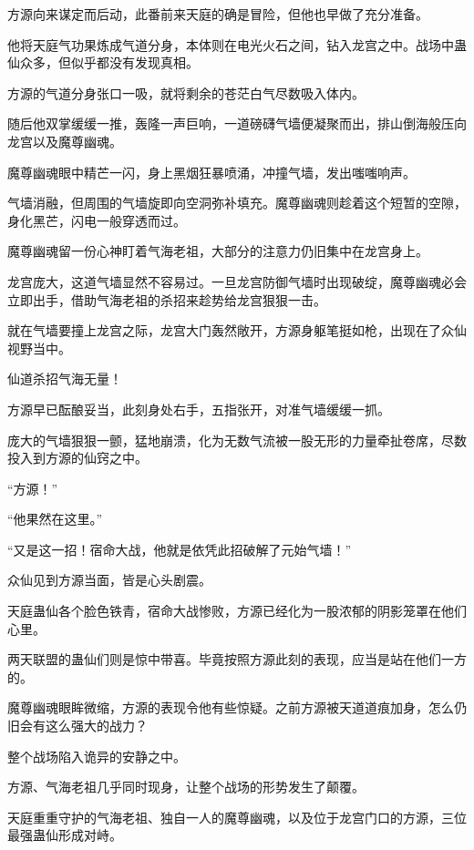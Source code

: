 
\begin{this_body}



方源向来谋定而后动，此番前来天庭的确是冒险，但他也早做了充分准备。

他将天庭气功果炼成气道分身，本体则在电光火石之间，钻入龙宫之中。战场中蛊仙众多，但似乎都没有发现真相。

方源的气道分身张口一吸，就将剩余的苍茫白气尽数吸入体内。

随后他双掌缓缓一推，轰隆一声巨响，一道磅礴气墙便凝聚而出，排山倒海般压向龙宫以及魔尊幽魂。

魔尊幽魂眼中精芒一闪，身上黑烟狂暴喷涌，冲撞气墙，发出嗤嗤响声。

气墙消融，但周围的气墙旋即向空洞弥补填充。魔尊幽魂则趁着这个短暂的空隙，身化黑芒，闪电一般穿透而过。

魔尊幽魂留一份心神盯着气海老祖，大部分的注意力仍旧集中在龙宫身上。

龙宫庞大，这道气墙显然不容易过。一旦龙宫防御气墙时出现破绽，魔尊幽魂必会立即出手，借助气海老祖的杀招来趁势给龙宫狠狠一击。

就在气墙要撞上龙宫之际，龙宫大门轰然敞开，方源身躯笔挺如枪，出现在了众仙视野当中。

仙道杀招气海无量！

方源早已酝酿妥当，此刻身处右手，五指张开，对准气墙缓缓一抓。

庞大的气墙狠狠一颤，猛地崩溃，化为无数气流被一股无形的力量牵扯卷席，尽数投入到方源的仙窍之中。

“方源！”

“他果然在这里。”

“又是这一招！宿命大战，他就是依凭此招破解了元始气墙！”

众仙见到方源当面，皆是心头剧震。

天庭蛊仙各个脸色铁青，宿命大战惨败，方源已经化为一股浓郁的阴影笼罩在他们心里。

两天联盟的蛊仙们则是惊中带喜。毕竟按照方源此刻的表现，应当是站在他们一方的。

魔尊幽魂眼眸微缩，方源的表现令他有些惊疑。之前方源被天道道痕加身，怎么仍旧会有这么强大的战力？

整个战场陷入诡异的安静之中。

方源、气海老祖几乎同时现身，让整个战场的形势发生了颠覆。

天庭重重守护的气海老祖、独自一人的魔尊幽魂，以及位于龙宫门口的方源，三位最强蛊仙形成对峙。


\end{this_body}
